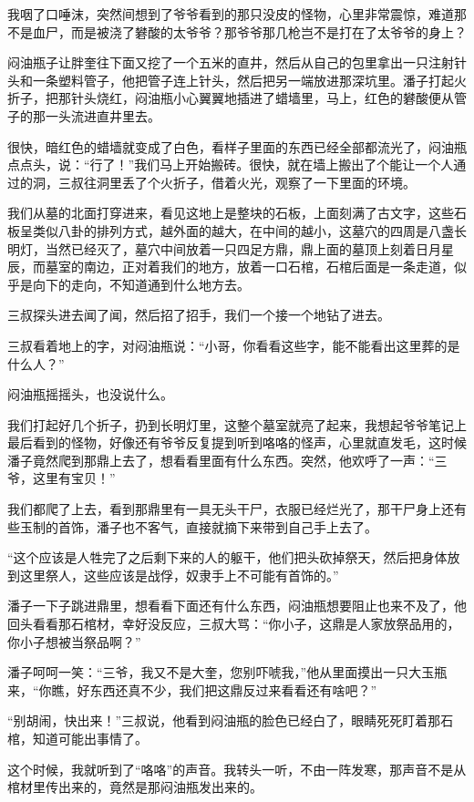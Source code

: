 我咽了口唾沫，突然间想到了爷爷看到的那只没皮的怪物，心里非常震惊，难道那不是血尸，而是被浇了礬酸的太爷爷？那爷爷那几枪岂不是打在了太爷爷的身上？

闷油瓶子让胖奎往下面又挖了一个五米的直井，然后从自己的包里拿出一只注射针头和一条塑料管子，他把管子连上针头，然后把另一端放进那深坑里。潘子打起火折子，把那针头烧红，闷油瓶小心翼翼地插进了蜡墙里，马上，红色的礬酸便从管子的那一头流进直井里去。

很快，暗红色的蜡墙就变成了白色，看样子里面的东西已经全部都流光了，闷油瓶点点头，说：“行了！”我们马上开始搬砖。很快，就在墙上搬出了个能让一个人通过的洞，三叔往洞里丢了个火折子，借着火光，观察了一下里面的环境。

我们从墓的北面打穿进来，看见这地上是整块的石板，上面刻满了古文字，这些石板呈类似八卦的排列方式，越外面的越大，在中间的越小，这墓穴的四周是八盏长明灯，当然已经灭了，墓穴中间放着一只四足方鼎，鼎上面的墓顶上刻着日月星辰，而墓室的南边，正对着我们的地方，放着一口石棺，石棺后面是一条走道，似乎是向下的走向，不知道通到什么地方去。

三叔探头进去闻了闻，然后招了招手，我们一个接一个地钻了进去。

三叔看着地上的字，对闷油瓶说：“小哥，你看看这些字，能不能看出这里葬的是什么人？”

闷油瓶摇摇头，也没说什么。

我们打起好几个折子，扔到长明灯里，这整个墓室就亮了起来，我想起爷爷笔记上最后看到的怪物，好像还有爷爷反复提到听到咯咯的怪声，心里就直发毛，这时候潘子竟然爬到那鼎上去了，想看看里面有什么东西。突然，他欢呼了一声：“三爷，这里有宝贝！”

我们都爬了上去，看到那鼎里有一具无头干尸，衣服已经烂光了，那干尸身上还有些玉制的首饰，潘子也不客气，直接就摘下来带到自己手上去了。

“这个应该是人牲完了之后剩下来的人的躯干，他们把头砍掉祭天，然后把身体放到这里祭人，这些应该是战俘，奴隶手上不可能有首饰的。”

潘子一下子跳进鼎里，想看看下面还有什么东西，闷油瓶想要阻止也来不及了，他回头看看那石棺材，幸好没反应，三叔大骂：“你小子，这鼎是人家放祭品用的，你小子想被当祭品啊？”

潘子呵呵一笑：“三爷，我又不是大奎，您别吓唬我，”他从里面摸出一只大玉瓶来，“你瞧，好东西还真不少，我们把这鼎反过来看看还有啥吧？”

“别胡闹，快出来！”三叔说，他看到闷油瓶的脸色已经白了，眼睛死死盯着那石棺，知道可能出事情了。

这个时候，我就听到了“咯咯”的声音。我转头一听，不由一阵发寒，那声音不是从棺材里传出来的，竟然是那闷油瓶发出来的。

